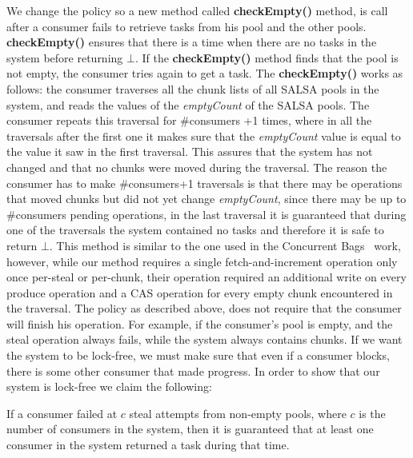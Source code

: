 We change the policy so a new method called {\bf checkEmpty()} method, is call after a consumer fails to retrieve tasks from his pool and the other pools. {\bf checkEmpty()} ensures that there is a time when there are no tasks in the system before returning $\bot$. If the {\bf checkEmpty()} method finds that the pool is not empty, the consumer tries again to get a task. The {\bf checkEmpty()} works as follows: the consumer traverses all the chunk lists of all SALSA pools in the system, and reads the values of the \emph{emptyCount} of the SALSA pools. The consumer repeats this traversal for \#consumers +1 times, where in all the traversals after the first one it makes sure that the \emph{emptyCount} value is equal to the value it saw in the first traversal. This assures that the system has not changed and that no chunks were moved during the traversal. The reason the consumer has to make \#consumers+1 traversals is that there may be operations that moved chunks but did not yet change \emph{emptyCount}, since there may be up to \#consumers pending operations, in the last traversal it is guaranteed that during one of the traversals the system contained no tasks and therefore it is safe to return $\bot$. This method is similar to the one used in the Concurrent Bags~\cite{Sundell:2011:LAC:1989493.1989550} work, however, while our method requires a single fetch-and-increment operation only once per-steal or per-chunk, their operation required an additional write on every produce operation and a CAS operation for every empty chunk encountered in the traversal.
The policy as described above, does not require that the consumer will finish his operation. For example, if the consumer's pool is empty, and the steal operation always fails, while the system always contains chunks. If we want the system to be lock-free, we must make sure that even if a consumer blocks, there is some other consumer that made progress. In order to show that our system is lock-free we claim the following: 

\begin{claim}
If a consumer failed at $c$ steal attempts from non-empty pools, where $c$ is the number of consumers in the system, then it is guaranteed that at least one consumer in the system returned a task during that time. 
\end{claim}

